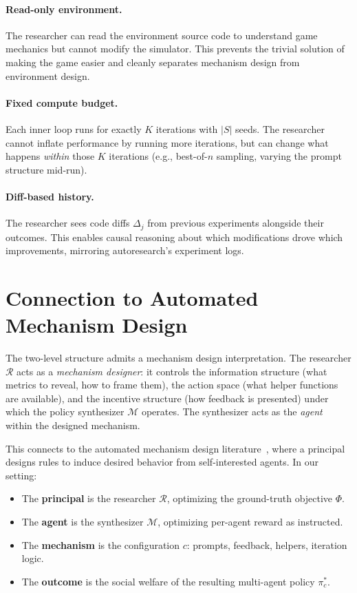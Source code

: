 \documentclass[10pt,twocolumn]{article}
\newcommand{\cR}{\mathcal{R}}
\newcommand{\cM}{\mathcal{M}}
\begin{document}
\paragraph{Read-only environment.}
The researcher can read the environment source code to understand game mechanics but cannot modify the simulator. This prevents the trivial solution of making the game easier and cleanly separates mechanism design from environment design.

\paragraph{Fixed compute budget.}
Each inner loop runs for exactly $K$ iterations with $|S|$ seeds. The researcher cannot inflate performance by running more iterations, but can change what happens \emph{within} those $K$ iterations (e.g., best-of-$n$ sampling, varying the prompt structure mid-run).

\paragraph{Diff-based history.}
The researcher sees code diffs $\Delta_j$ from previous experiments alongside their outcomes. This enables causal reasoning about which modifications drove which improvements, mirroring autoresearch's experiment logs.

\section{Connection to Automated Mechanism Design}

The two-level structure admits a mechanism design interpretation. The researcher $\cR$ acts as a \emph{mechanism designer}: it controls the information structure (what metrics to reveal, how to frame them), the action space (what helper functions are available), and the incentive structure (how feedback is presented) under which the policy synthesizer $\cM$ operates. The synthesizer acts as the \emph{agent} within the designed mechanism.

This connects to the automated mechanism design literature~\cite{conitzer2002}, where a principal designs rules to induce desired behavior from self-interested agents. In our setting:
\begin{itemize}
  \item The \textbf{principal} is the researcher $\cR$, optimizing the ground-truth objective $\Phi$.
  \item The \textbf{agent} is the synthesizer $\cM$, optimizing per-agent reward as instructed.
  \item The \textbf{mechanism} is the configuration $c$: prompts, feedback, helpers, iteration logic.
  \item The \textbf{outcome} is the social welfare of the resulting multi-agent policy $\pi^*_c$.
\end{itemize}
\end{document}
